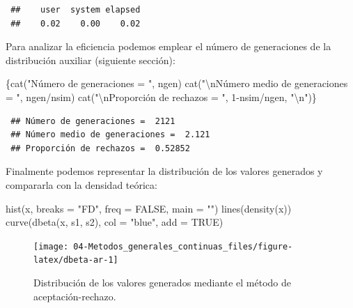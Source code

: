 \documentclass[
  10pt,
]{book}
\newenvironment{Shaded}{\begin{snugshade}}{\end{snugshade}}
\newcommand{\AttributeTok}[1]{\textcolor[rgb]{0.77,0.63,0.00}{#1}}
\newcommand{\ConstantTok}[1]{\textcolor[rgb]{0.00,0.00,0.00}{#1}}
\newcommand{\DecValTok}[1]{\textcolor[rgb]{0.00,0.00,0.81}{#1}}
\newcommand{\FunctionTok}[1]{\textcolor[rgb]{0.00,0.00,0.00}{#1}}
\newcommand{\NormalTok}[1]{#1}
\newcommand{\SpecialCharTok}[1]{\textcolor[rgb]{0.00,0.00,0.00}{#1}}
\newcommand{\StringTok}[1]{\textcolor[rgb]{0.31,0.60,0.02}{#1}}
\theoremstyle{break}
\theoremstyle{nonumberplain}
\begin{document}
\begin{verbatim}
 ##    user  system elapsed 
 ##    0.02    0.00    0.02
\end{verbatim}

Para analizar la eficiencia podemos emplear el número de generaciones de la distribución auxiliar (siguiente sección):

\begin{Shaded}
\begin{Highlighting}[]
\NormalTok{\{}\FunctionTok{cat}\NormalTok{(}\StringTok{"Número de generaciones = "}\NormalTok{, ngen)}
\FunctionTok{cat}\NormalTok{(}\StringTok{"}\SpecialCharTok{\textbackslash{}n}\StringTok{Número medio de generaciones = "}\NormalTok{, ngen}\SpecialCharTok{/}\NormalTok{nsim)}
\FunctionTok{cat}\NormalTok{(}\StringTok{"}\SpecialCharTok{\textbackslash{}n}\StringTok{Proporción de rechazos = "}\NormalTok{, }\DecValTok{1}\SpecialCharTok{{-}}\NormalTok{nsim}\SpecialCharTok{/}\NormalTok{ngen, }\StringTok{"}\SpecialCharTok{\textbackslash{}n}\StringTok{"}\NormalTok{)\}}
\end{Highlighting}
\end{Shaded}

\begin{verbatim}
 ## Número de generaciones =  2121
 ## Número medio de generaciones =  2.121
 ## Proporción de rechazos =  0.52852
\end{verbatim}

Finalmente podemos representar la distribución de los valores generados y compararla con la densidad teórica:

\begin{Shaded}
\begin{Highlighting}[]
\FunctionTok{hist}\NormalTok{(x, }\AttributeTok{breaks =} \StringTok{"FD"}\NormalTok{, }\AttributeTok{freq =} \ConstantTok{FALSE}\NormalTok{, }\AttributeTok{main =} \StringTok{""}\NormalTok{)}
\FunctionTok{lines}\NormalTok{(}\FunctionTok{density}\NormalTok{(x))}
\FunctionTok{curve}\NormalTok{(}\FunctionTok{dbeta}\NormalTok{(x, s1, s2), }\AttributeTok{col =} \StringTok{"blue"}\NormalTok{, }\AttributeTok{add =} \ConstantTok{TRUE}\NormalTok{)}
\end{Highlighting}
\end{Shaded}

\begin{figure}[!htbp]

{\centering \texttt{[image: 04-Metodos\_generales\_continuas\_files/figure-latex/dbeta-ar-1]} 

}

\caption{Distribución de los valores generados mediante el método de aceptación-rechazo.}\label{fig:dbeta-ar}
\end{figure}
\end{document}
